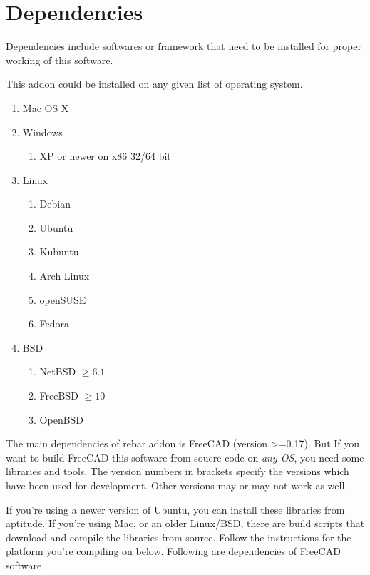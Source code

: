 \section{Dependencies}
Dependencies include softwares or framework that need to be installed for proper working of this software.

This addon could be installed on any given list of operating system.

\begin{enumerate}
	\item Mac OS X
	\item Windows
	 \begin{enumerate} 
	 	\item XP or newer on x86 32/64 bit
	 \end{enumerate}
	\item Linux
	\begin{enumerate} 
		\item Debian 
		\item Ubuntu 
		\item Kubuntu
		\item Arch Linux
		\item openSUSE
		\item Fedora
	 \end{enumerate}
	\item BSD
	\begin{enumerate}
		\item NetBSD  $\geq 6.1$
		\item FreeBSD $\geq 10 $
		\item OpenBSD
	\end{enumerate}
\end{enumerate}	 
 

The main dependencies of rebar addon is FreeCAD (version >=0.17). But If you want to build FreeCAD this software from soucre code on \emph{any OS}, you need some libraries and tools. The version
numbers in brackets specify the versions which have been used for
development. Other versions may or may not work as well.

If you're using a newer version of Ubuntu, you can install these 
libraries from aptitude. If you're using Mac, or an older Linux/BSD, there 
are build scripts that download and compile the libraries from source. 
Follow the instructions for the platform you're compiling on below. Following are
dependencies of FreeCAD software.

